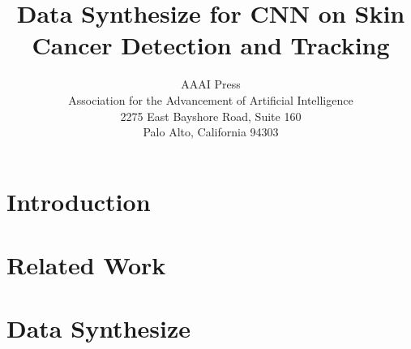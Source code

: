 \documentclass[letterpaper]{article}
\begin{document}
%
\title{Data Synthesize for CNN on Skin Cancer Detection and Tracking}
\author{AAAI Press\\
Association for the Advancement of Artificial Intelligence\\
2275 East Bayshore Road, Suite 160\\
Palo Alto, California 94303\\
}
\maketitle
\begin{abstract}
 
\end{abstract}


\section{Introduction}


\section{Related Work}

\cite{tensorflow}
\cite{ImageNet}

\cite{PoissonImageEditing}
\cite{Render4CNN}
\cite{FlowNet}

\cite{RCNN}
\cite{FastRCNN}
\cite{FasterRCNN}
\cite{R-FCN}

\cite{SIFTFLow}
\cite{DeformableSpatialPyramid}
\cite{DenseCorrespondence3D}
\cite{StereoMatching}

\cite{FaceDetection-ConvNet-3D}
\cite{AtrousConv}
\cite{WarpNet}

\cite{VGGNet}

\cite{DoConvnetsLearnCorrespondence}
\cite{FullyConvolutionalNeuralNetwork}



\section{Data Synthesize}
\end{document}
